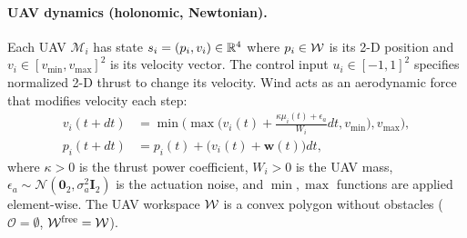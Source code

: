 \documentclass{article}
\providecommand{\obst}{\mathcal{O}}
\providecommand{\free}{\mathrm{free}}
\begin{document}
\paragraph{UAV dynamics (holonomic, Newtonian).}
Each UAV $\mathcal{M}_i$ has state $s_i = (p_i, v_i) \in \mathbb{R}^4$ where $p_i \in \mathcal{W}$ is its 2-D position and $v_i \in [v_{\min}, v_{\max}]^2$ is its velocity vector. The control input $u_i \in [-1,1]^2$ specifies normalized 2-D thrust to change its velocity. Wind acts as an aerodynamic force that modifies velocity each step:
\begin{align}
    v_i(t+dt) &= \min \Big( \max \Big( v_i(t) + \tfrac{\kappa \mu_i(t) + \epsilon_a}{W_i} dt,  v_{\min} \Big),  v_{\max}\Big), \label{eq:uav_vel} \\
    p_i(t+dt) &= p_i(t) + \big(v_i(t) + \mathbf{w}(t)\big) dt, \label{eq:uav_pos}
\end{align}
where $\kappa > 0$ is the thrust power coefficient, $W_i > 0$ is the UAV mass, $\epsilon_a \sim \mathcal{N}(\mathbf{0}_2, \sigma_a^2 \mathbf{I}_2)$ is the actuation noise, and $\min, \max$ functions are applied element-wise. The UAV workspace $\mathcal{W}$ is a convex polygon without obstacles ($\obst = \emptyset$, $\wspace^{\free} = \wspace$).
\end{document}
